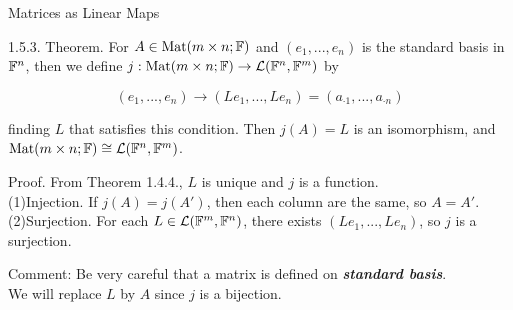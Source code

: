 \documentclass[hyperref={pdfpagelabels=true}]{beamer}
\renewcommand{\L}{\mathcal{L}}
\newcommand{\Mat}{\text{Mat}}
\newcommand{\highlightg}[1]{\textcolor[rgb]{0.1,0.5,0.3}{\emph{\textbf{#1}}}}
\newcommand{\structb}[1]{\textcolor[rgb]{0.2,0.2,0.7}{#1}}
\newcommand{\<}{\langle}
\renewcommand{\>}{\rangle}
\begin{document}
\begin{frame}{Matrices as Linear Maps}
    \begin{block}{1.5.3. Theorem.}
        For $A \in \text{Mat}(m \times n;\mathbb{F})$ and $(e_{1},...,e_{n})$ is the standard basis in $\mathbb{F}^{n}$, then we define $j:\Mat(m \times n;\F) \rightarrow \L(\F^{n},\F^{m})$ by 
        \begin{spacing}{0.7}
        \[
            (e_{1},...,e_{n}) \rightarrow (Le_{1},...,Le_{n}) = (a_{\cdot 1},...,a_{\cdot n})\]
        \end{spacing}
        finding $L$ that satisfies this condition. Then $j(A) = L$ is an isomorphism, and $\Mat(m \times n;\F) \cong \L(\F^{n},\F^{m})$.  
    \end{block}
    \begin{block}{Proof.}
        From Theorem 1.4.4., $L$ is unique and $j$ is a function.\\
        \structb{(1)Injection.} If $j(A) = j(A')$, then each column are the same, so $A = A'$.\\
        \structb{(2)Surjection.} For each $L \in \L(\F^{m},\F^{n})$, there exists $(Le_{1},...,Le_{n})$, so $j$ is a surjection.\\
    \end{block}
    \begin{block}{Comment:}
        Be very careful that a matrix is defined on \highlightg{standard basis}.\\
        We will replace $L$ by $A$ since $j$ is a bijection.
    \end{block}
\end{frame}
\end{document}
